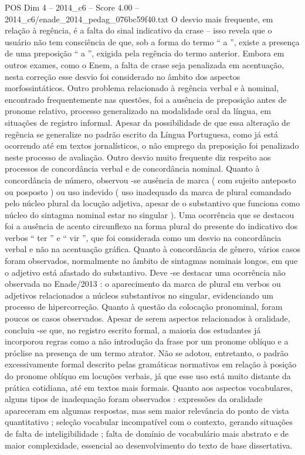 \begin{textsample}{POS Dim 4 – 2014\_c6 – Score 4.00 – 2014\_c6/enade\_2014\_pedag\_076bc59f40.txt}
O desvio mais frequente, em relação à regência, é a falta do sinal indicativo da crase – isso revela que o usuário não tem consciência de que, sob a forma do termo “ a ”, existe a presença de uma preposição “ a ”, exigida pela regência do termo anterior.
Embora em outros exames, como o Enem, a falta de crase seja penalizada em acentuação, nesta correção esse desvio foi considerado no âmbito dos aspectos morfossintáticos.
Outro problema relacionado à regência verbal e à nominal, encontrado frequentemente nas questões, foi a ausência de preposição antes de pronome relativo, processo generalizado na modalidade oral da língua, em situações de registro informal.
Apesar da possibilidade de que essa alteração de regência se generalize no padrão escrito da Língua Portuguesa, como já está ocorrendo até em textos jornalísticos, o não emprego da preposição foi penalizado neste processo de avaliação.
Outro desvio muito frequente diz respeito aos processos de concordância verbal e de concordância nominal.
Quanto à concordância de número, observou -se ausência de marca ( com sujeito anteposto ou posposto ) ou uso indevido ( uso inadequado da marca de plural comandado pelo núcleo plural da locução adjetiva, apesar de o substantivo que funciona como núcleo do sintagma nominal estar no singular ).
Uma ocorrência que se destacou foi a ausência de acento circunflexo na forma plural do presente do indicativo dos verbos “ ter ” e “ vir ”, que foi considerada como um desvio na concordância verbal e não na acentuação gráfica.
Quanto à concordância de gênero, vários casos foram observados, normalmente no âmbito de sintagmas nominais longos, em que o adjetivo está afastado do substantivo.
Deve -se destacar uma ocorrência não observada no Enade/2013 : o aparecimento da marca de plural em verbos ou adjetivos relacionados a núcleos substantivos no singular, evidenciando um processo de hipercorreção.
Quanto à questão da colocação pronominal, foram poucos os casos observados.
Apesar de serem aspectos relacionados à oralidade, concluiu -se que, no registro escrito formal, a maioria dos estudantes já incorporou regras como a não introdução da frase por um pronome oblíquo e a próclise na presença de um termo atrator.
Não se adotou, entretanto, o padrão excessivamente formal descrito pelas gramáticas normativas em relação à posição do pronome oblíquo em locuções verbais, já que esse uso está muito distante da prática cotidiana, até em textos mais formais.
Quanto aos aspectos vocabulares, alguns tipos de inadequação foram observados : expressões da oralidade apareceram em algumas respostas, mas sem maior relevância do ponto de vista quantitativo ; seleção vocabular incompatível com o contexto, gerando situações de falta de inteligibilidade ; falta de domínio de vocabulário mais abstrato e de maior complexidade, essencial ao desenvolvimento do texto de base dissertativa.

\end{textsample}
